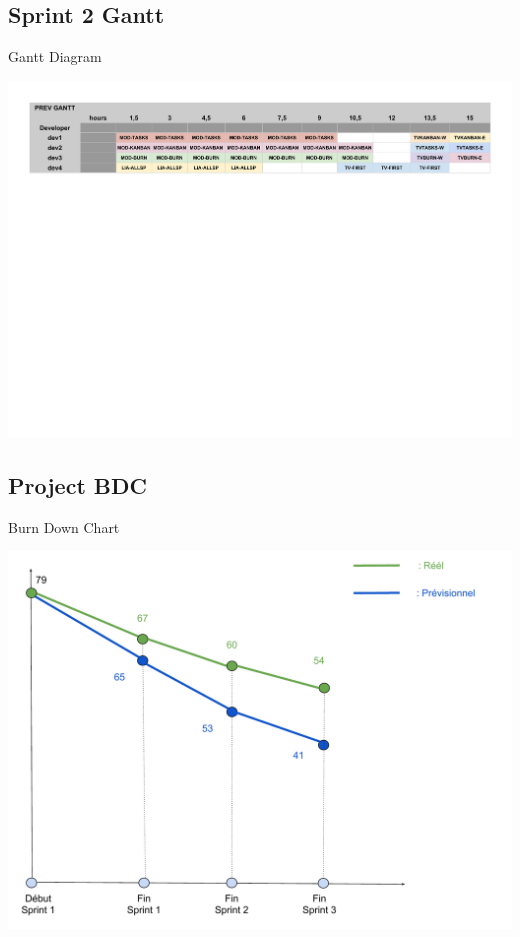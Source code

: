 \documentclass{beamer}
\begin{document}
\subsection{Sprint 2 Gantt}

\begin{frame}{Gantt Diagram}
	\begin{center}
        \includegraphics[scale=0.412]{Gantt4.pdf}
        \end{center}
\end{frame}

\subsection{Project BDC}

\begin{frame}{Burn Down Chart}
	\begin{center}
        \includegraphics[scale=0.35]{BDC.pdf}
        \end{center}
\end{frame}
\end{document}
